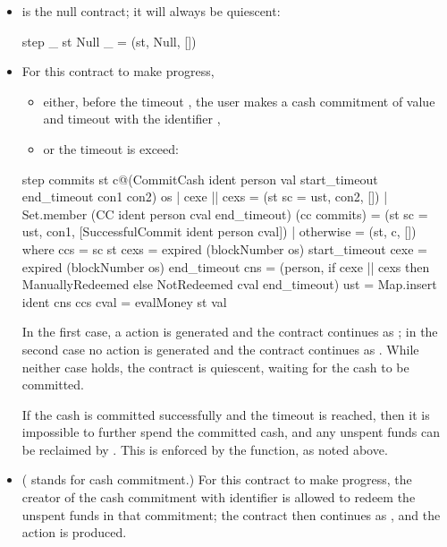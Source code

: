 \documentclass[runningheads]{llncs}
\begin{document}
\begin{itemize}
\item {} is the null contract; it will always be quiescent:

\begin{haskellcode}
step _ st Null _ = (st, Null, [])
\end{haskellcode}

\medskip
\noindent
\item {}  For this contract to make 
progress,\begin{itemize}
\item either, before the timeout , the user  makes a cash commitment 
of value 
 and timeout   with the identifier , 
\item
or the timeout  is exceed:
\end{itemize} 

\begin{haskellcode}
step 
  commits 
  st 
  c@(CommitCash ident person val start_timeout end_timeout con1 con2) 
  os
  | cexe || cexs = (st {sc = ust}, con2, [])
  | Set.member (CC ident person cval end_timeout) (cc commits)
        = (st {sc = ust}, con1, [SuccessfulCommit ident person cval])
  | otherwise = (st, c, [])
  where ccs = sc st
        cexs = expired (blockNumber os) start_timeout
        cexe = expired (blockNumber os) end_timeout
        cns = (person, if cexe || cexs 
                          then ManuallyRedeemed 
                          else NotRedeemed cval end_timeout)
        ust = Map.insert ident cns ccs
        cval = evalMoney st val
\end{haskellcode}
In the first case, a  action is generated and the contract continues as 
; in the second case no action is generated and the contract continues as 
. While neither case holds, the contract is quiescent, waiting for the cash to be committed. 

If the cash is committed successfully and the timeout  is reached, then it is impossible to 
further spend the committed cash, and any unspent funds can be reclaimed by .
 This is enforced by the  function, as noted above.

\medskip
\noindent
\item {} ( stands for cash commitment.) For this contract to make 
progress, the creator of the cash commitment with identifier  is allowed to redeem the unspent 
funds in that commitment; the contract then continues as , and the action 
 is produced. 


\end{itemize}
\end{document}

